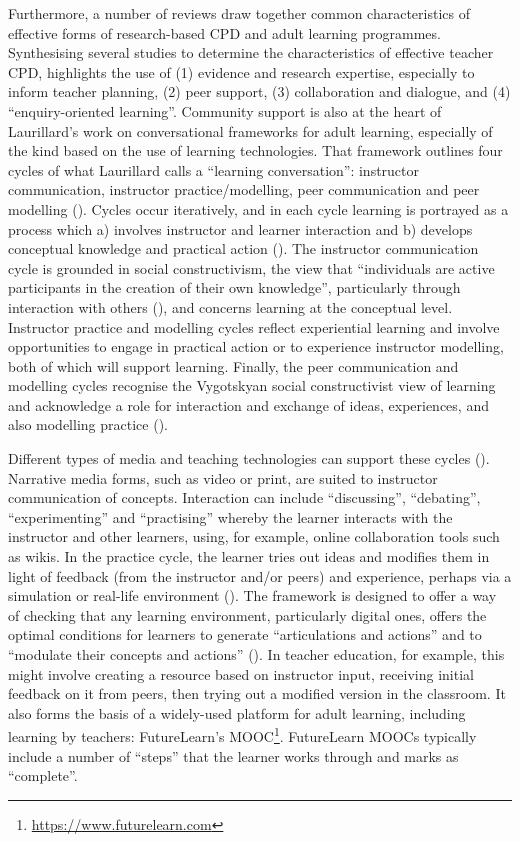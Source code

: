 \documentclass[output=paper]{langscibook}
\begin{document}
Furthermore, a number of reviews draw together common characteristics of effective forms of research-based CPD and adult learning programmes. Synthesising several studies to determine the characteristics of effective teacher CPD, \citet[240]{Cordingley2015} highlights the use of
(1) evidence and research expertise, especially to inform teacher planning,
(2) peer support,
(3) collaboration and dialogue, and
(4) ``enquiry-oriented learning''. Community support is also at the heart of Laurillard’s work on conversational frameworks for adult learning, especially of the kind based on the use of learning technologies. That framework outlines four cycles of what Laurillard calls a ``learning conversation'': instructor communication, instructor practice/modelling, peer communication and peer modelling (\citealt{Laurillard2012}). Cycles occur iteratively, and in each cycle learning is portrayed as a process which
a) involves instructor and learner interaction and
b) develops conceptual knowledge and practical action (\citealt[87]{Laurillard2012}). The instructor communication cycle is grounded in social constructivism, the view that ``individuals are active participants in the creation of their own knowledge'', particularly through interaction with others (\citealt[67]{DavisEtAl2017}), and concerns learning at the conceptual level. Instructor practice and modelling cycles reflect experiential learning and involve opportunities to engage in practical action or to experience instructor modelling, both of which will support learning. Finally, the peer communication and modelling cycles recognise the Vygotskyan social constructivist view of learning and acknowledge a role for interaction and exchange of ideas, experiences, and also modelling practice (\citealt{Laurillard2012}).

Different types of media and teaching technologies can support these cycles (\citealt{Laurillard2002}). Narrative media forms, such as video or print, are suited to instructor communication of concepts. Interaction can include ``discussing'', ``debating'', ``experimenting'' and ``practising'' whereby the learner interacts with the instructor and other learners, using, for example, online collaboration tools such as wikis. In the practice cycle, the learner tries out ideas and modifies them in light of feedback (from the instructor and/or peers) and experience, perhaps via a simulation or real-life environment (\citealt{Laurillard2002}). The framework is designed to offer a way of checking that any learning environment, particularly digital ones, offers the optimal conditions for learners to generate ``articulations and actions'' and to ``modulate their concepts and actions'' (\cites[]{Laurillard2007}[94]{Laurillard2012}). In teacher education, for example, this might involve creating a resource based on instructor input, receiving initial feedback on it from peers, then trying out a modified version in the classroom. It also forms the basis of a widely-used platform for adult learning, including learning by teachers: FutureLearn’s MOOC\footnote{\url{https://www.futurelearn.com}}. FutureLearn MOOCs typically include a number of ``steps'' that the learner works through and marks as ``complete''.
\end{document}
